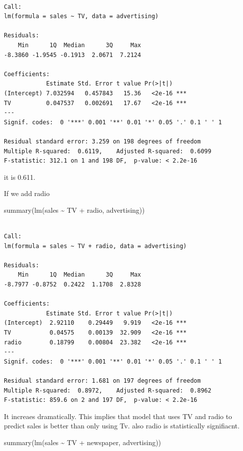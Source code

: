 \documentclass[
  letterpaper,
  DIV=11,
  numbers=noendperiod]{scrreprt}
\newenvironment{Shaded}{\begin{snugshade}}{\end{snugshade}}
\newcommand{\FunctionTok}[1]{\textcolor[rgb]{0.28,0.35,0.67}{#1}}
\newcommand{\NormalTok}[1]{\textcolor[rgb]{0.00,0.23,0.31}{#1}}
\newcommand{\SpecialCharTok}[1]{\textcolor[rgb]{0.37,0.37,0.37}{#1}}
\begin{document}
\begin{verbatim}

Call:
lm(formula = sales ~ TV, data = advertising)

Residuals:
    Min      1Q  Median      3Q     Max 
-8.3860 -1.9545 -0.1913  2.0671  7.2124 

Coefficients:
            Estimate Std. Error t value Pr(>|t|)    
(Intercept) 7.032594   0.457843   15.36   <2e-16 ***
TV          0.047537   0.002691   17.67   <2e-16 ***
---
Signif. codes:  0 '***' 0.001 '**' 0.01 '*' 0.05 '.' 0.1 ' ' 1

Residual standard error: 3.259 on 198 degrees of freedom
Multiple R-squared:  0.6119,    Adjusted R-squared:  0.6099 
F-statistic: 312.1 on 1 and 198 DF,  p-value: < 2.2e-16
\end{verbatim}

it is 0.611.

If we add radio

\begin{Shaded}
\begin{Highlighting}[]
\FunctionTok{summary}\NormalTok{(}\FunctionTok{lm}\NormalTok{(sales }\SpecialCharTok{\textasciitilde{}}\NormalTok{ TV }\SpecialCharTok{+}\NormalTok{ radio, advertising))}
\end{Highlighting}
\end{Shaded}

\begin{verbatim}

Call:
lm(formula = sales ~ TV + radio, data = advertising)

Residuals:
    Min      1Q  Median      3Q     Max 
-8.7977 -0.8752  0.2422  1.1708  2.8328 

Coefficients:
            Estimate Std. Error t value Pr(>|t|)    
(Intercept)  2.92110    0.29449   9.919   <2e-16 ***
TV           0.04575    0.00139  32.909   <2e-16 ***
radio        0.18799    0.00804  23.382   <2e-16 ***
---
Signif. codes:  0 '***' 0.001 '**' 0.01 '*' 0.05 '.' 0.1 ' ' 1

Residual standard error: 1.681 on 197 degrees of freedom
Multiple R-squared:  0.8972,    Adjusted R-squared:  0.8962 
F-statistic: 859.6 on 2 and 197 DF,  p-value: < 2.2e-16
\end{verbatim}

It increaes dramatically. This implies that model that uses TV and radio
to predict sales is better than only using Tv. also radio is
statistically signifiacnt.

\begin{Shaded}
\begin{Highlighting}[]
\FunctionTok{summary}\NormalTok{(}\FunctionTok{lm}\NormalTok{(sales }\SpecialCharTok{\textasciitilde{}}\NormalTok{ TV }\SpecialCharTok{+}\NormalTok{ newspaper, advertising))}
\end{Highlighting}
\end{Shaded}
\end{document}
